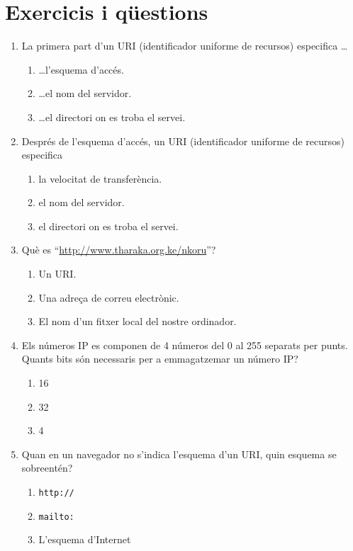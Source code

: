 \section{Exercicis i qüestions}
\begin{enumerate}

\item La primera part d'un URI (identificador uniforme de recursos)
  especifica \ldots
  \begin{enumerate}
  \item \ldots l'esquema d'accés.
  \item \ldots el nom del servidor.
  \item \ldots el directori on es troba el servei.
  \end{enumerate}

\item Després de l'esquema d'accés, un URI (identificador uniforme de
  recursos) especifica
  \begin{enumerate}
  \item la velocitat de transferència.
  \item el nom del servidor.
  \item el directori on es troba el servei.
  \end{enumerate}

\item Què es ``\url{http://www.tharaka.org.ke/nkoru}''?
  \begin{enumerate}
  \item Un URI.
  \item Una adreça de correu electrònic.
  \item El nom d'un fitxer local del nostre ordinador.
  \end{enumerate}

\item Els números IP es componen de 4 números del 0 al 255 separats
  per punts. Quants bits són necessaris per a emmagatzemar un número
  IP?
  \begin{enumerate}
  \item 16
  \item 32
  \item 4
  \end{enumerate}

\item Quan en un navegador no s'indica l'esquema d'un URI, quin
  esquema se sobreentén?  
  \begin{enumerate}
  \item \texttt{http://}
  \item \texttt{mailto:}
  \item L'esquema d'Internet
  \end{enumerate}


\end{enumerate}
